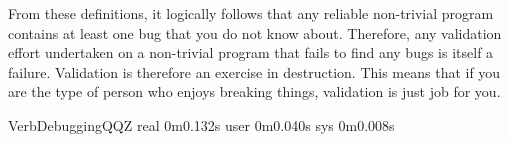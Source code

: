 From these definitions, it logically follows that any reliable
non-trivial program contains at least one bug that you do not
know about.
Therefore, any validation effort undertaken on a non-trivial program
that fails to find any bugs is itself a failure.
Validation is therefore an exercise in destruction.
This means that if you are the type of person who enjoys breaking things,
validation is just job for you.

\begin{SaveVerbatim}{VerbDebuggingQQZ}
        real    0m0.132s
        user    0m0.040s
        sys     0m0.008s
\end{SaveVerbatim}


